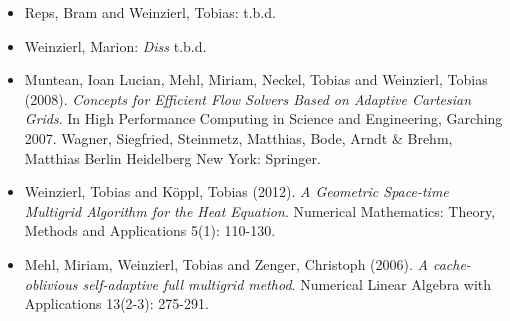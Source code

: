 \begin{itemize}
  \item  Reps, Bram and Weinzierl, Tobias: t.b.d.
  \item Weinzierl, Marion: {\em Diss} t.b.d.
  \item   Muntean, Ioan Lucian, Mehl, Miriam, Neckel, Tobias and Weinzierl,
  Tobias (2008). {\em Concepts for Efficient Flow Solvers Based on Adaptive
  Cartesian Grids}. In High Performance Computing in Science and Engineering, Garching 2007. Wagner, Siegfried, Steinmetz, Matthias, Bode, Arndt & Brehm, Matthias Berlin Heidelberg New York: Springer.
  \item Weinzierl, Tobias and K\"oppl, Tobias (2012). {\em A Geometric
  Space-time Multigrid Algorithm for the Heat Equation}. Numerical Mathematics:
  Theory, Methods and Applications 5(1): 110-130.
  \item Mehl, Miriam, Weinzierl, Tobias and Zenger, Christoph (2006). {\em A
  cache-oblivious self-adaptive full multigrid method}. Numerical Linear Algebra
  with Applications 13(2-3): 275-291.
\end{itemize}
